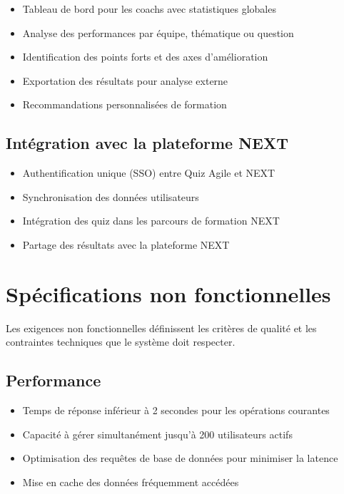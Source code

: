 \documentclass[12pt,a4paper]{report}
\begin{document}
\begin{itemize}
\item Tableau de bord pour les coachs avec statistiques globales
\item Analyse des performances par équipe, thématique ou question
\item Identification des points forts et des axes d'amélioration
\item Exportation des résultats pour analyse externe
\item Recommandations personnalisées de formation
\end{itemize}

\subsection{Intégration avec la plateforme NEXT}

\begin{itemize}
\item Authentification unique (SSO) entre Quiz Agile et NEXT
\item Synchronisation des données utilisateurs
\item Intégration des quiz dans les parcours de formation NEXT
\item Partage des résultats avec la plateforme NEXT
\end{itemize}

\section{Spécifications non fonctionnelles}

Les exigences non fonctionnelles définissent les critères de qualité et
les contraintes techniques que le système doit respecter.

\subsection{Performance}

\begin{itemize}
\item Temps de réponse inférieur à 2 secondes pour les opérations courantes
\item Capacité à gérer simultanément jusqu'à 200 utilisateurs actifs
\item Optimisation des requêtes de base de données pour minimiser la latence
\item Mise en cache des données fréquemment accédées
\end{itemize}
\end{document}

